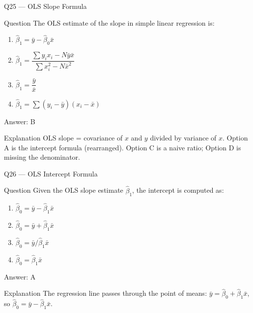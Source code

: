 \documentclass[aspectratio=169,8pt]{beamer}
\begin{document}
	\begin{frame}{Q25 --- OLS Slope Formula}
		\begin{block}{Question}
			The OLS estimate of the slope in simple linear regression is:
			\begin{enumerate}
				\item $\hat{\beta}_1 = \bar{y} - \hat{\beta}_0 \bar{x}$
				\item $\hat{\beta}_1 = \dfrac{\sum y_i x_i - N \bar{y} \bar{x}}{\sum x_i^2 - N \bar{x}^2}$
				\item $\hat{\beta}_1 = \dfrac{\bar{y}}{\bar{x}}$
				\item $\hat{\beta}_1 = \sum (y_i - \bar{y})(x_i - \bar{x})$
			\end{enumerate}
		\end{block}
		\begin{exampleblock}{Answer: B}\end{exampleblock}
		\begin{block}{Explanation}
			OLS slope = covariance of $x$ and $y$ divided by variance of $x$. Option A is the intercept formula (rearranged). Option C is a naive ratio; Option D is missing the denominator.
		\end{block}
	\end{frame}
	
	\begin{frame}{Q26 --- OLS Intercept Formula}
		\begin{block}{Question}
			Given the OLS slope estimate $\hat{\beta}_1$, the intercept is computed as:
			\begin{enumerate}
				\item $\hat{\beta}_0 = \bar{y} - \hat{\beta}_1 \bar{x}$
				\item $\hat{\beta}_0 = \bar{y} + \hat{\beta}_1 \bar{x}$
				\item $\hat{\beta}_0 = \bar{y} / \hat{\beta}_1 \bar{x}$
				\item $\hat{\beta}_0 = \hat{\beta}_1 \bar{x}$
			\end{enumerate}
		\end{block}
		\begin{exampleblock}{Answer: A}\end{exampleblock}
		\begin{block}{Explanation}
			The regression line passes through the point of means: $\bar{y} = \hat{\beta}_0 + \hat{\beta}_1 \bar{x}$, so $\hat{\beta}_0 = \bar{y} - \hat{\beta}_1 \bar{x}$.
		\end{block}
	\end{frame}
	
\end{document}
